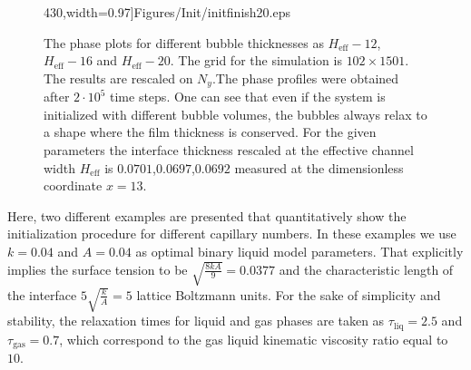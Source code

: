 \documentclass[preprint,12pt]{elsarticle}
\begin{document}
\begin{figure}
430,width=0.97\textwidth]{Figures/Init/initfinish20.eps}\\
\caption{The phase plots for different bubble thicknesses as
$H_{\mathrm{eff}}-12$, $H_{\mathrm{eff}}-16$ and
$H_{\mathrm{eff}}-20$. The grid for the simulation is $102 \times 1501$. The results are rescaled
on $N_y$.The phase
profiles were obtained after $2\cdot10^5$ time steps. One can see that even if the
system is initialized with different bubble volumes, the bubbles always relax
to a shape where the film thickness is conserved. For the given parameters the
interface thickness rescaled at the effective channel width $H_{\mathrm{eff}}$  is
$0.0701$,$0.0697$,$0.0692$ measured at the dimensionless coordinate $x=13$.
\label{fig:different:initialization:widths}}
\end{figure}

Here, two different examples are presented that quantitatively show the
initialization procedure for different capillary numbers. In these
examples we use $k=0.04$ and $A=0.04$ as optimal binary liquid model parameters.
That explicitly implies the surface tension to be $\sqrt{\frac{8 k
A}{9}}=0.0377$ and the characteristic length of the interface
$5\sqrt{\frac{k}{A}}=5$ lattice Boltzmann units. For the sake of simplicity and
stability, the relaxation times for liquid and gas phases are taken as
$\tau_{\mathrm{liq}}=2.5$ and $\tau_{\mathrm{gas}}=0.7$, which correspond
to the gas liquid kinematic viscosity ratio equal to $10$.
\end{document}
